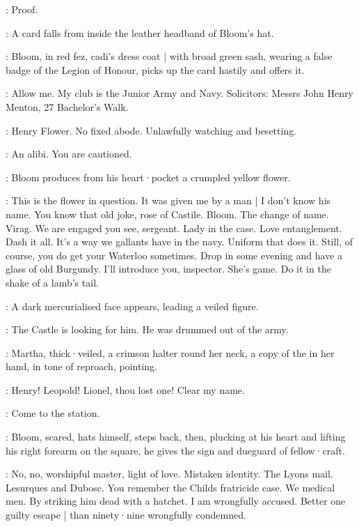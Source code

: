 \FirstWatch:
Proof.

:
A card falls from inside the leather headband of Bloom's hat.

:
Bloom,
in red fez,
cadi's dress coat |
with broad green sash,
wearing a false badge of the Legion of Honour,
picks up the card hastily and offers it.

\Bloom:
Allow me.
My club is the Junior Army and Navy.
Solicitors:
Messrs John Henry Menton,
27 Bachelor's Walk.

\FirstWatch:
Henry Flower.
No fixed abode.
Unlawfully watching and besetting.

\SecondWatch[2]:
An alibi.
You are cautioned.

:
Bloom produces from his heart·pocket a crumpled yellow flower.

\Bloom:
This is the flower in question.
It was given me by a man |
I don't know his name.
You know that old joke,
rose of Castile.
Bloom.
The change of name.
Virag.
We are engaged you see,
sergeant.
Lady in the case.
Love entanglement.
Dash it all.
It's a way we gallants have in the navy.
Uniform that does it.
Still,
of course,
you do get your Waterloo sometimes.
Drop in some evening and have a glass of old Burgundy.
I'll introduce you,
inspector.
She's game.
Do it in the shake of a lamb's tail.

:
A dark mercurialised face appears,
leading a veiled figure.

\DarkMercury:
The Castle is looking for him.
He was drummed out of the army.

:
Martha,
thick·veiled,
a crimson halter round her neck,
a copy of the 
in her hand,
in tone of reproach,
pointing.

\Martha:
Henry!
Leopold!
Lionel,
thou lost one!
Clear my name.

\FirstWatch[1]:
Come to the station.

:
Bloom,
scared,
hats himself,
steps back,
then,
plucking at his heart and lifting his right forearm on the square,
he gives the sign and dueguard of fellow·craft.

\Bloom:
No,
no,
worshipful master,
light of love.
Mistaken identity.
The Lyons mail.
Lesurques and Dubosc.
You remember the Childs fratricide case.
We medical men.
By striking him dead with a hatchet.
I am wrongfully accused.
Better one guilty escape |
than ninety·nine wrongfully condemned.

